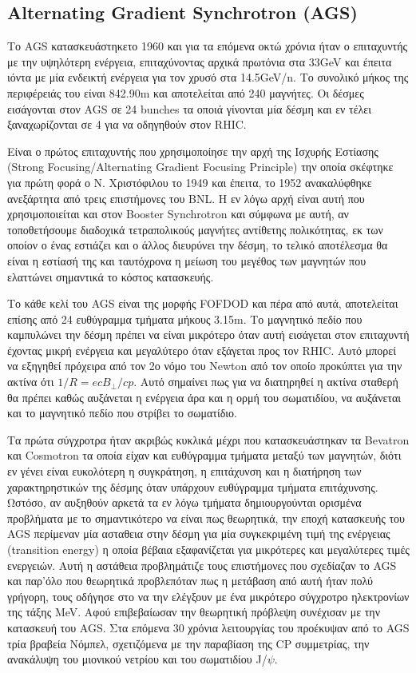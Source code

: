 \subsection{Alternating Gradient Synchrotron (AGS)}


	Το AGS κατασκευάστηκετο 1960 και για τα επόμενα οκτώ χρόνια ήταν ο επιταχυντής με την υψηλότερη ενέργεια, επιταχύνοντας αρχικά πρωτόνια στα 33GeV και έπειτα ιόντα με μία ενδεικτή ενέργεια για τον χρυσό στα 14.5GeV/n.
	Το συνολικό μήκος της περιφέρειάς του είναι 842.90m και αποτελείται από 240 μαγνήτες. Οι δέσμες εισάγονται στον AGS σε 24 bunches τα οποιά γίνονται μία δέσμη και εν τέλει ξαναχωρίζονται σε 4 για να οδηγηθούν στον RHIC.
	
	 Είναι ο πρώτος επιταχυντής που χρησιμοποίησε την αρχή της Ισχυρής Εστίασης (Strong Focusing/Alternating Gradient Focusing Principle) την οποία σκέφτηκε για πρώτη φορά ο Ν. Χριστόφιλου το 1949 και έπειτα, το 1952 ανακαλύφθηκε ανεξάρτητα από τρεις επιστήμονες του BNL. 
	 Η εν λόγω αρχή είναι αυτή που χρησιμοποιείται και στον Booster Synchrotron και σύμφωνα με αυτή, αν τοποθετήσουμε διαδοχικά τετραπολικούς μαγνήτες αντίθετης πολικότητας, εκ των οποίον ο ένας εστιάζει και ο άλλος διευρύνει την δέσμη, το τελικό αποτέλεσμα θα είναι η εστίασή της και ταυτόχρονα η μείωση του μεγέθος των μαγνητών που ελαττώνει σημαντικά το κόστος κατασκευής. 
	
	Το κάθε κελί του AGS είναι της μορφής FOFDOD και πέρα από αυτά, αποτελείται επίσης από 24 ευθύγραμμα τμήματα μήκους 3.15m. Το μαγνητικό πεδίο που καμπυλώνει την δέσμη πρέπει να είναι μικρότερο όταν αυτή εισάγεται στον επιταχυντή έχοντας μικρή ενέργεια και μεγαλύτερο όταν εξάγεται προς τον RHIC. Αυτό μπορεί να εξηγηθεί πρόχειρα από τον 2ο νόμο του Newton από τον οποίο προκύπτει για την ακτίνα ότι $1/R = ecB_\perp/cp$. Αυτό σημαίνει πως για να διατηρηθεί η ακτίνα σταθερή θα πρέπει καθώς αυξάνεται η ενέργεια άρα και η ορμή του σωματιδίου, να αυξάνεται και το μαγνητικό πεδίο που στρίβει το σωματίδιο.
	
	Τα πρώτα σύγχροτρα ήταν ακριβώς κυκλικά μέχρι που κατασκευάστηκαν τα Bevatron και Cosmotron τα οποία είχαν και ευθύγραμμα τμήματα μεταξύ των μαγνητών, διότι εν γένει είναι ευκολότερη η συγκράτηση, η επιτάχυνση και η διατήρηση των χαρακτηρηστικών της δέσμης όταν υπάρχουν ευθύγραμμα τμήματα επιτάχυνσης.
	Ωστόσο, αν αυξηθούν αρκετά τα εν λόγω τμήματα δημιουργούνται ορισμένα προβλήματα με το σημαντικότερο να είναι πως θεωρητικά, την εποχή κατασκευής του AGS περίμεναν μία ασταθεια στην δέσμη για μία συγκεκριμένη τιμή της ενέργειας (transition energy) η οποία βέβαια εξαφανίζεται για μικρότερες και μεγαλύτερες τιμές ενεργειών. 
	Αυτή η αστάθεια προβλημάτιζε τους επιστήμονες που σχεδίαζαν το AGS και παρ'όλο που θεωρητικά προβλεπόταν πως η μετάβαση από αυτή ήταν πολύ γρήγορη, τους οδήγησε στο να την ελέγξουν με ένα μικρότερο σύγχροτρο ηλεκτρονίων της τάξης MeV. Αφού επιβεβαίωσαν την θεωρητική πρόβλεψη συνέχισαν με την κατασκευή του AGS. Στα επόμενα 30 χρόνια λειτουργίας του προέκυψαν από το AGS τρία βραβεία Νόμπελ, σχετιζόμενα με την παραβίαση της CP συμμετρίας, την ανακάλυψη του μιονικού νετρίου και του σωματιδίου J/$\psi$.